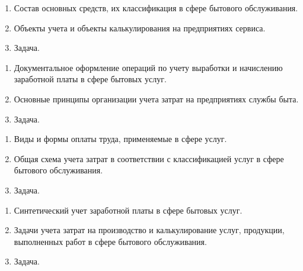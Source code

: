 \newpage


\shapkFull
\setcounter{zad}{0}

\begin{enumerate}
	\item Состав основных средств, их классификация в сфере бытового обслуживания.

	\item Объекты учета и объекты калькулирования на предприятиях сервиса.

	\item Задача.
\end{enumerate}

\newpage


\shapkFull
\setcounter{zad}{0}

\begin{enumerate}
	\item Документальное оформление операций по учету выработки и начислению заработной платы в сфере бытовых услуг.

	\item Основные принципы организации учета затрат на предприятиях службы быта.

	\item Задача.
\end{enumerate}

\newpage


\shapkFull
\setcounter{zad}{0}

\begin{enumerate}
	\item Виды и формы оплаты труда, применяемые в сфере услуг.

	\item Общая схема учета затрат в соответствии с классификацией услуг в сфере бытового обслуживания.

	\item Задача.
\end{enumerate}

\newpage


\shapkFull
\setcounter{zad}{0}

\begin{enumerate}
	\item Синтетический учет заработной платы в сфере бытовых услуг.

	\item Задачи учета затрат на производство и калькулирование услуг, продукции, выполненных работ в сфере бытового обслуживания.

	\item Задача.
\end{enumerate}

